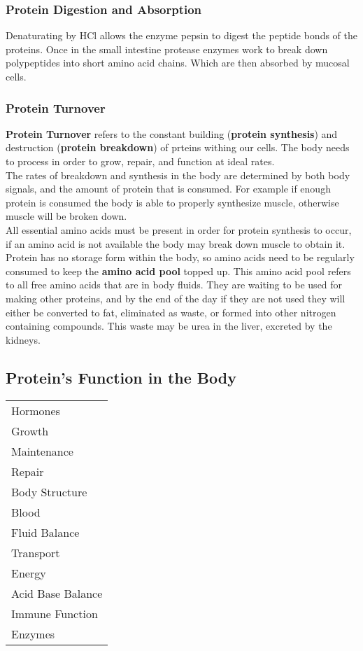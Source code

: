 \documentclass[letterpaper, 11pt]{article}
\begin{document}
\subsubsection{Protein Digestion and Absorption}
\label{sec:org22bd919}
Denaturating by HCl allows the enzyme pepsin to digest the peptide bonds of the proteins. Once in the small intestine protease enzymes work to break down polypeptides into short amino acid chains. Which are then absorbed by mucosal cells.\\
\subsubsection{Protein Turnover}
\label{sec:orgf9c955d}
\textbf{Protein Turnover} refers to the constant building (\textbf{protein synthesis}) and destruction (\textbf{protein breakdown}) of prteins withing our cells. The body needs to process in order to grow, repair, and function at ideal rates.\\
The rates of breakdown and synthesis in the body are determined by both body signals, and the amount of protein that is consumed. For example if enough protein is consumed the body is able to properly synthesize muscle, otherwise muscle will be broken down.\\
All essential amino acids must be present in order for protein synthesis to occur, if an amino acid is not available the body may break down muscle to obtain it.\\
Protein has no storage form within the body, so amino acids need to be regularly consumed to keep the \textbf{amino acid pool} topped up. This amino acid pool refers to all free amino acids that are in body fluids. They are waiting to be used for making other proteins, and by the end of the day if they are not used they will either be converted to fat, eliminated as waste, or formed into other nitrogen containing compounds. This waste may be urea in the liver, excreted by the kidneys.\\
\subsection{Protein's Function in the Body}
\label{sec:orgf78c75a}
\begin{center}
\begin{tabular}{l}
Hormones\\
Growth\\
Maintenance\\
Repair\\
Body Structure\\
Blood\\
Fluid Balance\\
Transport\\
Energy\\
Acid Base Balance\\
Immune Function\\
Enzymes\\
\end{tabular}
\end{center}
\end{document}
